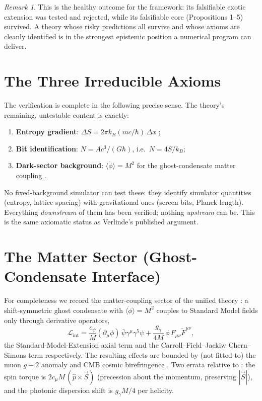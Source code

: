 \documentclass[11pt,a4paper]{article}
\theoremstyle{definition}
\theoremstyle{remark}
\newtheorem{remark}{Remark}
\begin{document}
\begin{remark}
This is the healthy outcome for the framework: its falsifiable exotic
extension was tested and rejected, while its falsifiable core
(Propositions 1--5) survived. A theory whose risky predictions all survive
and whose axioms are cleanly identified is in the strongest epistemic
position a numerical program can deliver.
\end{remark}

\section{The Three Irreducible Axioms}
\label{sec:axioms}

The verification is complete in the following precise sense. The theory's
remaining, untestable content is exactly:
\begin{enumerate}
\item \textbf{Entropy gradient}: $\Delta S = 2\pi k_B (mc/\hbar)\,\Delta x$
\cite{Verlinde2011};
\item \textbf{Bit identification}: $N = A c^3/(G\hbar)$, i.e.\ $N = 4S/k_B$;
\item \textbf{Dark-sector background}: $\langle\dot\phi\rangle = M^2$ for the
ghost-condensate matter coupling \cite{ArkaniHamed2004,HGCExpanded}.
\end{enumerate}
No fixed-background simulator can test these: they identify simulator
quantities (entropy, lattice spacing) with gravitational ones (screen bits,
Planck length). Everything \emph{downstream} of them has been verified;
nothing \emph{upstream} can be. This is the same axiomatic status as
Verlinde's published argument.

\section{The Matter Sector (Ghost-Condensate Interface)}

For completeness we record the matter-coupling sector of the unified theory
\cite{HGCExpanded}: a shift-symmetric ghost condensate
\cite{ArkaniHamed2004} with $\langle\dot\phi\rangle = M^2$ couples to Standard
Model fields only through derivative operators,
\[
\mathcal L_{\mathrm{int}}
= \frac{c_\psi}{M}(\partial_\mu\phi)\,\bar\psi\gamma^\mu\gamma^5\psi
+ \frac{g_\gamma}{4M}\,\phi\, F_{\mu\nu}\tilde F^{\mu\nu},
\]
the Standard-Model-Extension axial term \cite{ColladayKostelecky1998} and the
Carroll--Field--Jackiw Chern--Simons term \cite{CFJ1990} respectively. The
resulting effects are bounded by (not fitted to) the muon $g-2$ anomaly
\cite{Fermilab2021} and CMB cosmic birefringence \cite{MinamiKomatsu2020}.
Two errata relative to \cite{HGCExpanded}: the spin torque is
$2c_\mu M\,(\hat p \times \vec S)$ (precession about the momentum, preserving
$|\vec S|$), and the photonic dispersion shift is $g_\gamma M/4$ per helicity.
\end{document}
